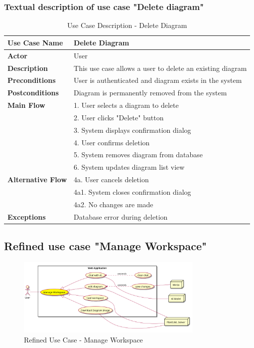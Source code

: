 \subsubsection{Textual description of use case "Delete diagram"}
\begin{table}[H]
\centering
\caption{Use Case Description - Delete Diagram}
\begin{tabular}{|l|p{10cm}|}
\hline
\textbf{Use Case Name} & Delete Diagram \\
\hline
\textbf{Actor} & User \\
\hline
\textbf{Description} & This use case allows a user to delete an existing diagram \\
\hline
\textbf{Preconditions} & User is authenticated and diagram exists in the system \\
\hline
\textbf{Postconditions} & Diagram is permanently removed from the system \\
\hline
\textbf{Main Flow} & 1. User selects a diagram to delete \\
& 2. User clicks "Delete" button \\
& 3. System displays confirmation dialog \\
& 4. User confirms deletion \\
& 5. System removes diagram from database \\
& 6. System updates diagram list view \\
\hline
\textbf{Alternative Flow} & 4a. User cancels deletion \\
& 4a1. System closes confirmation dialog \\
& 4a2. No changes are made \\
\hline
\textbf{Exceptions} & Database error during deletion \\
\hline
\end{tabular}
\end{table}

\subsection{Refined use case "Manage Workspace"}

\begin{figure}[H]
\centering
\includegraphics[width=0.8\textwidth]{conception/SprintIV/use_case_diagrams/refined_use_case_feature_workspace_management.png}
\caption{Refined Use Case - Manage Workspace}
\end{figure}

